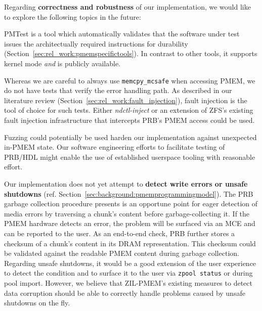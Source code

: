 \documentclass[12pt,a4paper,twoside]{book}
\begin{document}
Regarding \textbf{correctness and robustness} of our implementation, we would like to explore the following topics in the future:
\begin{description}[noitemsep,leftmargin=1.5cm,labelindent=1cm]
    \item[Validating PMEM Durability] PMTest is a tool which automatically validates that the software under test issues the architectually required instructions for durability (Section~\ref{sec:rel_work:pmemspecifictools}).
        In contrast to other tools, it supports kernel mode \textit{and} is publicly available.

    \item[Fault Injection for PMEM Access] Whereas we are careful to always use \lstinline{memcpy_mcsafe} when accessing PMEM, we do not have tests that verify the error handling path.
        As described in our literature review (Section~\ref{sec:rel_work:fault_injection}), fault injection is the tool of choice for such tests.
        Either \textit{ndctl-inject} or an extension of ZFS's existing fault injection infrastructure that intercepts PRB's PMEM access could be used.

    \item[Fuzzing] Fuzzing could potentially be used harden our implementation against unexpected in-PMEM state.
        Our software engineering efforts to facilitate testing of PRB/HDL might enable the use of established userspace tooling with reasonable effort.
\end{description}

Our implementation does not yet attempt to \textbf{detect write errors or unsafe shutdowns} (ref. Section~\ref{sec:background:pmemprogrammingmodel}).
The PRB garbage collection procedure presents is an opportune point for eager detection of media errors by traversing a chunk's content before garbage-collecting it.
If the PMEM hardware detects an error, the problem will be surfaced via an MCE and can be reported to the user.
As an end-to-end check, PRB further stores a checksum of a chunk's content in its DRAM representation. This checksum could be validated against the readable PMEM content during garbage collection.
Regarding unsafe shutdowns, it would be a good extension of the user experience to detect the condition and to surface it to the user via \lstinline{zpool status} or during pool import.
However, we believe that ZIL-PMEM's existing measures to detect data corruption should be able to correctly handle problems caused by unsafe shutdowns on the fly.
\end{document}
